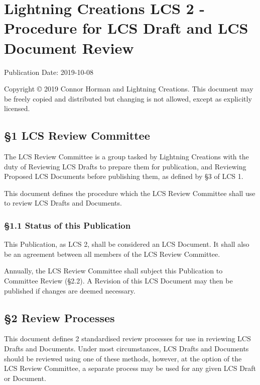 \hypertarget{lightning-creations-lcs-2---procedure-for-lcs-draft-and-lcs-document-review}{%
\section{Lightning Creations LCS 2 - Procedure for LCS Draft and LCS
Document
Review}\label{lightning-creations-lcs-2---procedure-for-lcs-draft-and-lcs-document-review}}

Publication Date: 2019-10-08

Copyright © 2019 Connor Horman and Lightning Creations. This document
may be freely copied and distributed but changing is not allowed, except
as explicitly licensed.

\hypertarget{lcs-review-committee}{%
\subsection{§1 LCS Review Committee}\label{lcs-review-committee}}

The LCS Review Committee is a group tasked by Lightning Creations with
the duty of Reviewing LCS Drafts to prepare them for publication, and
Reviewing Proposed LCS Documents before publishing them, as defined by
§3 of LCS 1.

This document defines the procedure which the LCS Review Committee shall
use to review LCS Drafts and Documents.

\hypertarget{status-of-this-publication}{%
\subsubsection{§1.1 Status of this
Publication}\label{status-of-this-publication}}

This Publication, as LCS 2, shall be considered an LCS Document. It
shall also be an agreement between all members of the LCS Review
Committee.

Annually, the LCS Review Committee shall subject this Publication to
Committee Review (§2.2). A Revision of this LCS Document may then be
published if changes are deemed necessary.

\hypertarget{review-processes}{%
\subsection{§2 Review Processes}\label{review-processes}}

This document defines 2 standardised review processes for use in
reviewing LCS Drafts and Documents. Under most circumstances, LCS Drafts
and Documents should be reviewed using one of these methods, however, at
the option of the LCS Review Committee, a separate process may be used
for any given LCS Draft or Document.

